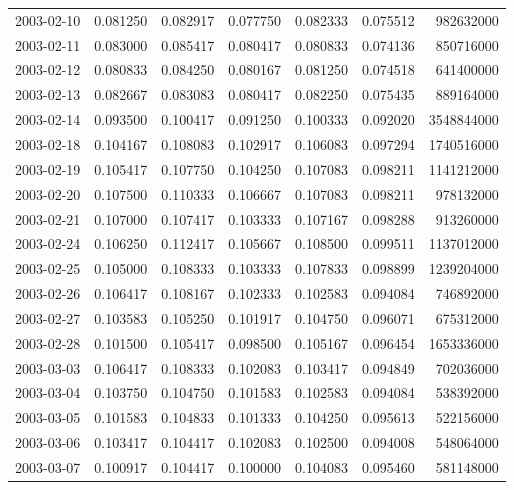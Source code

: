 \begin{tabular}{lrrrrrr}
2003-02-10 &    0.081250 &    0.082917 &    0.077750 &    0.082333 &    0.075512 &   982632000 \\
2003-02-11 &    0.083000 &    0.085417 &    0.080417 &    0.080833 &    0.074136 &   850716000 \\
2003-02-12 &    0.080833 &    0.084250 &    0.080167 &    0.081250 &    0.074518 &   641400000 \\
2003-02-13 &    0.082667 &    0.083083 &    0.080417 &    0.082250 &    0.075435 &   889164000 \\
2003-02-14 &    0.093500 &    0.100417 &    0.091250 &    0.100333 &    0.092020 &  3548844000 \\
2003-02-18 &    0.104167 &    0.108083 &    0.102917 &    0.106083 &    0.097294 &  1740516000 \\
2003-02-19 &    0.105417 &    0.107750 &    0.104250 &    0.107083 &    0.098211 &  1141212000 \\
2003-02-20 &    0.107500 &    0.110333 &    0.106667 &    0.107083 &    0.098211 &   978132000 \\
2003-02-21 &    0.107000 &    0.107417 &    0.103333 &    0.107167 &    0.098288 &   913260000 \\
2003-02-24 &    0.106250 &    0.112417 &    0.105667 &    0.108500 &    0.099511 &  1137012000 \\
2003-02-25 &    0.105000 &    0.108333 &    0.103333 &    0.107833 &    0.098899 &  1239204000 \\
2003-02-26 &    0.106417 &    0.108167 &    0.102333 &    0.102583 &    0.094084 &   746892000 \\
2003-02-27 &    0.103583 &    0.105250 &    0.101917 &    0.104750 &    0.096071 &   675312000 \\
2003-02-28 &    0.101500 &    0.105417 &    0.098500 &    0.105167 &    0.096454 &  1653336000 \\
2003-03-03 &    0.106417 &    0.108333 &    0.102083 &    0.103417 &    0.094849 &   702036000 \\
2003-03-04 &    0.103750 &    0.104750 &    0.101583 &    0.102583 &    0.094084 &   538392000 \\
2003-03-05 &    0.101583 &    0.104833 &    0.101333 &    0.104250 &    0.095613 &   522156000 \\
2003-03-06 &    0.103417 &    0.104417 &    0.102083 &    0.102500 &    0.094008 &   548064000 \\
2003-03-07 &    0.100917 &    0.104417 &    0.100000 &    0.104083 &    0.095460 &   581148000 \\

\end{tabular}
